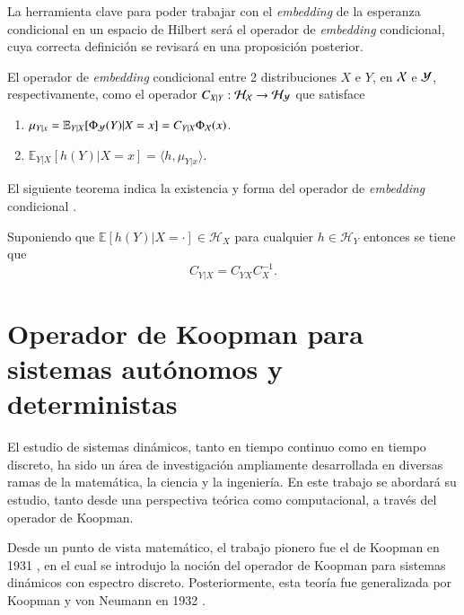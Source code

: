 La herramienta clave para poder trabajar con el \textit{embedding} de la esperanza condicional en un espacio de Hilbert será el operador de \textit{embedding} condicional, cuya correcta definición se revisará en una proposición posterior.
\begin{defn}
    El operador de \textit{embedding} condicional entre 2 distribuciones $X$ e $Y$, en $\mathcal{X}$ e $\mathcal{Y}$, respectivamente, como el operador $C_{X|Y} : \mathcal{H}_{\mathcal{X}} \to \mathcal{H}_{\mathcal{Y}}$ que satisface
    \begin{enumerate}
        \item $\mu_{Y|x} = \mathbb{E}_{Y|X}[\Phi_{\mathcal{Y}} (Y)|X=x] = C_{Y|X}\Phi_{\mathcal{X}} (x)$.
        \item $\mathbb{E}_{Y|X}[h(Y)|X=x] = \langle h, \mu_{Y|x} \rangle$.
    \end{enumerate}
\end{defn}
El siguiente teorema indica la existencia y forma del operador de \textit{embedding} condicional \cite{Fukumizu2004DimensionalitySpaces, Song2009HilbertSystems}.
\begin{teo}
    Suponiendo que \( \mathbb{E}[h(Y)|X = \cdot] \in \mathcal{H}_X \) para cualquier \( h \in \mathcal{H}_Y \) entonces se tiene que
    \[ C_{Y|X} = C_{YX} C_{X}^{-1}.\]
\end{teo}

\section{Operador de Koopman para sistemas autónomos y deterministas}

El estudio de sistemas dinámicos, tanto en tiempo continuo como en tiempo discreto, ha sido un área de investigación ampliamente desarrollada en diversas ramas de la matemática, la ciencia y la ingeniería. En este trabajo se abordará su estudio, tanto desde una perspectiva teórica como computacional, a través del operador de Koopman.  

Desde un punto de vista matemático, el trabajo pionero fue el de Koopman en 1931 \cite{Koopman1931HamiltonianSpace}, en el cual se introdujo la noción del operador de Koopman para sistemas dinámicos con espectro discreto. Posteriormente, esta teoría fue generalizada por Koopman y von Neumann en 1932 \cite{Koopman1932DynamicalSpectra}.  

